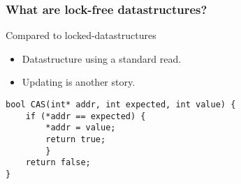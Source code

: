 \begin{frame}
\frametitle{What are lock-free datastructures?}
	\begin{block}{Compared to locked-datastructures}
		\begin{itemize}
			\item Datastructure using a standard \textcolor{ReneOrange}{read}.
			\item \textcolor{ReneOrange}{Updating} is another story.
		\end{itemize}
	\end{block}

	\begin{lstlisting}
bool CAS(int* addr, int expected, int value) {
	if (*addr == expected) {
		*addr = value;
		return true;
		}
	return false;
}  
	\end{lstlisting}
\end{frame}